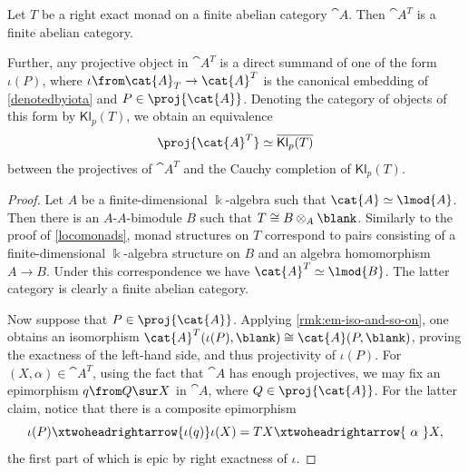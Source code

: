 \begin{proposition}\label{finitemonads}
  Let \(T\) be a right exact monad on a finite abelian category \(\cat{A}\).
  Then \(\cat{A}^T\) is a finite abelian category.

  Further, any projective object in \(\cat{A}^T\) is a direct summand of one of the form \(\iota(P)\),
  where \(\iota\from \cat{A}_T \to \cat{A}^T\) is the canonical embedding of \cref{denotedbyiota} and \(P \in \proj{\cat{A}}\).
  Denoting the category of objects of this form by \(\mathsf{Kl}_p(T)\),
  we obtain an equivalence
  \[
    \proj{\cat{A}^T} \simeq \overline{\mathsf{Kl}_{p}(T)}
  \]
  between the projectives of \(\cat{A}^T\) and the Cauchy completion of \(\mathsf{Kl}_p(T)\).
\end{proposition}
\begin{proof}
  Let \(A\) be a finite\hyp{}dimensional \(\Bbbk\)\hyp{}algebra such that \(\cat{A} \simeq \lmod{A}\).
  Then there is an \(A\)\hyp{}\(A\)\hyp{}bimodule \(B\) such that \(T \cong B \otimes_{A} \blank\).
  Similarly to the proof of \cref{locomonads},
  monad structures on \(T\) correspond to pairs consisting of a finite\hyp{}dimensional \(\Bbbk\)\hyp{}algebra structure on \(B\) and an algebra homomorphism \(A \to B\).
  Under this correspondence we have \(\cat{A}^T \simeq \lmod{B}\).
  The latter category is clearly a finite abelian category.

  Now suppose that \(P \in \proj{\cat{A}}\).
  Applying \cref{rmk:em-iso-and-so-on}, one obtains an isomorphism \(\cat{A}^T(\iota(P), \blank) \cong \cat{A}(P, \blank)\),
  proving the exactness of the left-hand side, and thus projectivity of \(\iota(P)\).
  For \((X, \alpha) \in \cat{A}^T\), using the fact that \(\cat{A}\) has enough projectives,
  we may fix an epimorphism \(q\from Q \sur X\) in \(\cat{A}\),
  where \(Q \in \proj{\cat{A}}\).
  For the latter claim, notice that there is a composite epimorphism
  \[
    \iota(P) \xtwoheadrightarrow{\iota(q)} \iota(X) = TX \xtwoheadrightarrow{\ \alpha\ } X,
  \]
  the first part of which is epic by right exactness of \(\iota\).
\end{proof}

